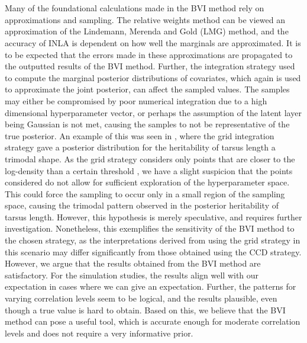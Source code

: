 \\
\\
Many of the foundational calculations made in the BVI method rely on approximations and sampling. The relative weights method can be viewed an approximation of the Lindemann, Merenda and Gold (LMG) method, and the accuracy of INLA is dependent on how well the marginals are approximated. It is to be expected that the errors made in these approximations are propagated to the outputted results of the BVI method. Further, the integration strategy used to compute the marginal posterior distributions of covariates, which again is used to approximate the joint posterior, can affect the sampled values. The samples may either be compromised by poor numerical integration due to a high dimensional hyperparameter vector, or perhaps the assumption of the latent layer being Gaussian is not met, causing the samples to not be representative of the true posterior. An example of this was seen in , where the grid integration strategy gave a posterior distribution for the heritability of tarsus length a trimodal shape. As the grid strategy considers only points that are closer to the log-density than a certain threshold \citep[See Figure 2.1 for Illustration]{gomezrubio2020inla}, we have a slight suspicion that the points considered do not allow for sufficient exploration of the hyperparameter space. This could force the sampling to occur only in a small region of the sampling space, causing the trimodal pattern observed in the posterior heritability of tarsus length. However, this hypothesis is merely speculative, and requires further investigation. Nonetheless, this exemplifies the sensitivity of the BVI method to the chosen strategy, as the interpretations derived from using the grid strategy in this scenario may differ significantly from those obtained using the CCD strategy. However, we argue that the results obtained from the BVI method are satisfactory. For the simulation studies, the results align well with our expectation in cases where we can give an expectation. Further, the patterns for varying correlation levels seem to be logical, and the results plausible, even though a true value is hard to obtain. Based on this, we believe that the BVI method can pose a useful tool, which is accurate enough for moderate correlation levels and does not require a very informative prior.
